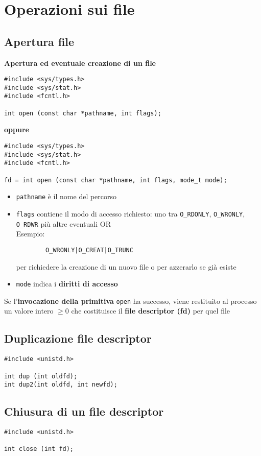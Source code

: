 \documentclass[italian,12pt,a4paper]{article}
\begin{document}
\section{Operazioni sui file}
\subsection{Apertura file}
\textbf{Apertura ed eventuale creazione di un file}
\begin{lstlisting}
#include <sys/types.h>
#include <sys/stat.h>
#include <fcntl.h>

int open (const char *pathname, int flags);
\end{lstlisting}
\textbf{oppure}
\begin{lstlisting}
#include <sys/types.h>
#include <sys/stat.h>
#include <fcntl.h>

fd = int open (const char *pathname, int flags, mode_t mode);
\end{lstlisting}
\begin{itemize}
	\item \verb|pathname| è il nome del percorso
	\item \verb|flags| contiene il modo di accesso richiesto: uno tra \verb|O_RDONLY|, \verb|O_WRONLY|, \verb|O_RDWR| più altre eventuali OR\\
	Esempio: 
	\begin{verbatim}
		O_WRONLY|O_CREAT|O_TRUNC
	\end{verbatim}
	per richiedere la creazione di un nuovo file o per azzerarlo se già esiste
	\item \verb|mode| indica i \textbf{diritti di accesso}
\end{itemize}
Se l'\textbf{invocazione della primitiva} \verb|open| ha successo, viene restituito al processo un valore intero $\geq 0$ che costituisce il \textbf{file descriptor (fd)} per quel file
\subsection{Duplicazione file descriptor}
\begin{lstlisting}
#include <unistd.h>

int dup (int oldfd);
int dup2(int oldfd, int newfd);
\end{lstlisting}
\subsection{Chiusura di un file descriptor}
\begin{lstlisting}
#include <unistd.h>

int close (int fd);
\end{lstlisting}
\end{document}

